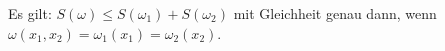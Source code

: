 \begin{lemma}
    Es gilt: $S(\omega) \leq S(\omega_1) + S(\omega_2)$ mit
                Gleichheit genau dann, wenn
                $\omega(x_1,x_2) = \omega_1(x_1) = \omega_2 (x_2)$.
\end{lemma}



